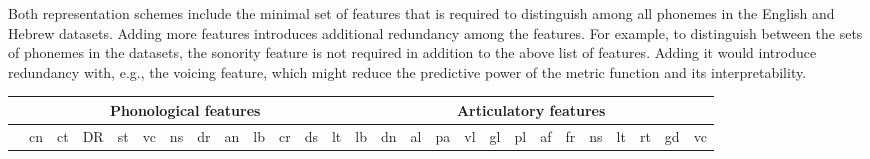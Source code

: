 Both representation schemes include the minimal set of features that is required to distinguish among all phonemes in the English and Hebrew datasets. Adding more features introduces additional redundancy among the features. For example, to distinguish between the sets of phonemes in the datasets, the sonority feature is not required in addition to the above list of features. Adding it would introduce redundancy with, e.g., the voicing feature, which might reduce the predictive power of the metric function and its interpretability.


\begin{landscape}%

\begin{table}[H]
\centering %
\tiny
\begin{tabular}{|c|c|c|c|c|c|c|c|c|c|c|c|c||c|c|c|c|c|c|c|c|c|c|c|c|c|c|}
\hline

&\multicolumn{12}{|c|}{Phonological features}&\multicolumn{14}{|c|}{Articulatory features}\\
\hline
&	cn	&	ct	&	DR	&	st	&	vc	&	ns	&	dr	&	an	&	lb	&	cr	&	ds	&	lt	&	lb	&	dn	&	al	&	pa	&	vl	&	gl	&	pl	&	af	&	fr	&	ns	&	lt	&	rt	&	gd	&	vc	\\
\hline


\end{tabular}
\end{table}
\end{landscape}
